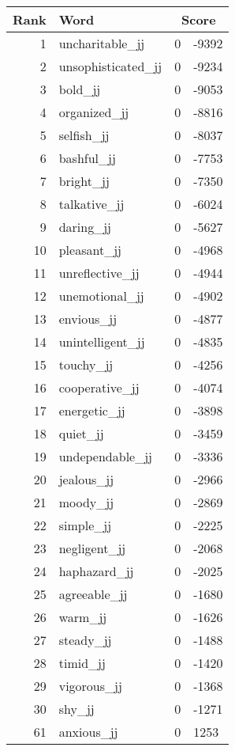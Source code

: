 \begin{longtable}[!htbp]{| rlr@{.}l |}
    \hline
    \textbf{Rank} & \textbf{Word} & \multicolumn{2}{c|}{\textbf{Score}} \\
    \hline
    \endhead
    1 & uncharitable\_jj & 0 & -9392 \\
    2 & unsophisticated\_jj & 0 & -9234 \\
    3 & bold\_jj & 0 & -9053 \\
    4 & organized\_jj & 0 & -8816 \\
    5 & selfish\_jj & 0 & -8037 \\
    6 & bashful\_jj & 0 & -7753 \\
    7 & bright\_jj & 0 & -7350 \\
    8 & talkative\_jj & 0 & -6024 \\
    9 & daring\_jj & 0 & -5627 \\
    10 & pleasant\_jj & 0 & -4968 \\
    11 & unreflective\_jj & 0 & -4944 \\
    12 & unemotional\_jj & 0 & -4902 \\
    13 & envious\_jj & 0 & -4877 \\
    14 & unintelligent\_jj & 0 & -4835 \\
    15 & touchy\_jj & 0 & -4256 \\
    16 & cooperative\_jj & 0 & -4074 \\
    17 & energetic\_jj & 0 & -3898 \\
    18 & quiet\_jj & 0 & -3459 \\
    19 & undependable\_jj & 0 & -3336 \\
    20 & jealous\_jj & 0 & -2966 \\
    21 & moody\_jj & 0 & -2869 \\
    22 & simple\_jj & 0 & -2225 \\
    23 & negligent\_jj & 0 & -2068 \\
    24 & haphazard\_jj & 0 & -2025 \\
    25 & agreeable\_jj & 0 & -1680 \\
    26 & warm\_jj & 0 & -1626 \\
    27 & steady\_jj & 0 & -1488 \\
    28 & timid\_jj & 0 & -1420 \\
    29 & vigorous\_jj & 0 & -1368 \\
    30 & shy\_jj & 0 & -1271 \\
    61 & anxious\_jj & 0 & 1253 \\

\end{longtable}
